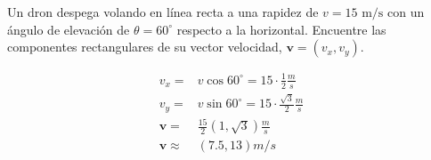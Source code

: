 \documentclass[12pt, a4paper]{article}
\begin{document}
\begin{exercise}[ID=dron, subtitle={Descomposición vectorial}, tags={parcial1}]
Un dron despega volando en línea recta a una rapidez de $v=15 \text{ m/s}$ con un ángulo de elevación de $\theta = 60^\circ$ respecto a la horizontal. Encuentre las componentes rectangulares de su vector velocidad, $\boldsymbol{v} = (v_x, v_y)$.
\end{exercise}
\begin{solution}
\begin{align*}
     v_x =& v \cos 60^\circ =  15\cdot \frac{1}{2}\frac{\unit{m}}{\unit{s}}\\   
     v_y =& v \sin 60^\circ = 15\cdot \frac{\sqrt{3}}{2}\frac{\unit{m}}{\unit{s}}\\
     \boldsymbol{v} =& \frac{15}{2}\left(1,\sqrt{3}\right)\frac{\unit{m}}{\unit{s}} \\
     \boldsymbol{v} \approx& (7.5,13)\unit{m/s}
\end{align*}
\end{solution}
\end{document}
